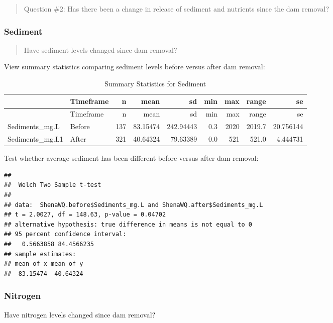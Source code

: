 \documentclass[
  12pt,
]{article}
\begin{document}
\begin{quote}
Question \#2: Has there been a change in release of sediment and
nutrients since the dam removal?
\end{quote}

\hypertarget{sediment}{%
\subsubsection{Sediment}\label{sediment}}

\begin{quote}
Have sediment levels changed since dam removal?
\end{quote}

View summary statistics comparing sediment levels before versus after
dam removal:

\begin{longtable}[]{@{}llrrrrrrr@{}}
\caption{Summary Statistics for Sediment}\tabularnewline
\toprule
& Timeframe & n & mean & sd & min & max & range & se \\
\midrule
\endfirsthead
\toprule
& Timeframe & n & mean & sd & min & max & range & se \\
\midrule
\endhead
Sediments\_mg.L & Before & 137 & 83.15474 & 242.94443 & 0.3 & 2020 &
2019.7 & 20.756144 \\
Sediments\_mg.L1 & After & 321 & 40.64324 & 79.63389 & 0.0 & 521 & 521.0
& 4.444731 \\
\bottomrule
\end{longtable}

Test whether average sediment has been different before versus after dam
removal:

\begin{verbatim}
## 
##  Welch Two Sample t-test
## 
## data:  ShenaWQ.before$Sediments_mg.L and ShenaWQ.after$Sediments_mg.L
## t = 2.0027, df = 148.63, p-value = 0.04702
## alternative hypothesis: true difference in means is not equal to 0
## 95 percent confidence interval:
##   0.5663858 84.4566235
## sample estimates:
## mean of x mean of y 
##  83.15474  40.64324
\end{verbatim}

\newpage

\hypertarget{nitrogen}{%
\subsubsection{Nitrogen}\label{nitrogen}}

Have nitrogen levels changed since dam removal?
\end{document}

